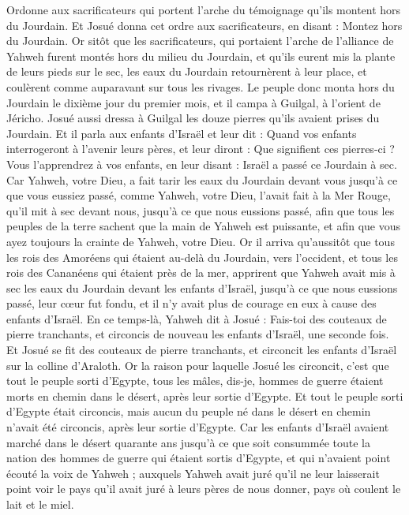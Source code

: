 \begin{multicols}{2}
Ordonne aux sacrificateurs qui portent l'arche du témoignage qu'ils montent hors du Jourdain.
Et Josué donna cet ordre aux sacrificateurs, en disant : Montez hors du Jourdain.
Or sitôt que les sacrificateurs, qui portaient l'arche de l'alliance de Yahweh furent montés hors du milieu du Jourdain, et qu'ils eurent mis la plante de leurs pieds sur le sec, les eaux du Jourdain retournèrent à leur place, et coulèrent comme auparavant sur tous les rivages.
Le peuple donc monta hors du Jourdain le dixième jour du premier mois, et il campa à Guilgal, à l'orient de Jéricho.
Josué aussi dressa à Guilgal les douze pierres qu'ils avaient prises du Jourdain.
Et il parla aux enfants d'Israël et leur dit : Quand vos enfants interrogeront à l'avenir leurs pères, et leur diront : Que signifient ces pierres-ci ?
Vous l'apprendrez à vos enfants, en leur disant : Israël a passé ce Jourdain à sec.
Car Yahweh, votre Dieu, a fait tarir les eaux du Jourdain devant vous jusqu'à ce que vous eussiez passé, comme Yahweh, votre Dieu, l'avait fait à la Mer Rouge, qu'il mit à sec devant nous, jusqu'à ce que nous eussions passé,
afin que tous les peuples de la terre sachent que la main de Yahweh est puissante, et afin que vous ayez toujours la crainte de Yahweh, votre Dieu.
\VerseOne{}Or il arriva qu'aussitôt que tous les rois des Amoréens qui étaient au-delà du Jourdain, vers l'occident, et tous les rois des Cananéens qui étaient près de la mer, apprirent que Yahweh avait mis à sec les eaux du Jourdain devant les enfants d'Israël, jusqu'à ce que nous eussions passé, leur cœur fut fondu, et il n'y avait plus de courage en eux à cause des enfants d'Israël.
En ce temps-là, Yahweh dit à Josué : Fais-toi des couteaux de pierre tranchants, et circoncis de nouveau les enfants d'Israël, une seconde fois.
Et Josué se fit des couteaux de pierre tranchants, et circoncit les enfants d'Israël sur la colline d'Araloth.
Or la raison pour laquelle Josué les circoncit, c'est que tout le peuple sorti d'Egypte, tous les mâles, dis-je, hommes de guerre étaient morts en chemin dans le désert, après leur sortie d'Egypte.
Et tout le peuple sorti d'Egypte était circoncis, mais aucun du peuple né dans le désert en chemin n'avait été circoncis, après leur sortie d'Egypte.
Car les enfants d'Israël avaient marché dans le désert quarante ans jusqu'à ce que soit consummée toute la nation des hommes de guerre qui étaient sortis d'Egypte, et qui n'avaient point écouté la voix de Yahweh ; auxquels Yahweh avait juré qu'il ne leur laisserait point voir le pays qu'il avait juré à leurs pères de nous donner, pays où coulent le lait et le miel.

\end{multicols}
